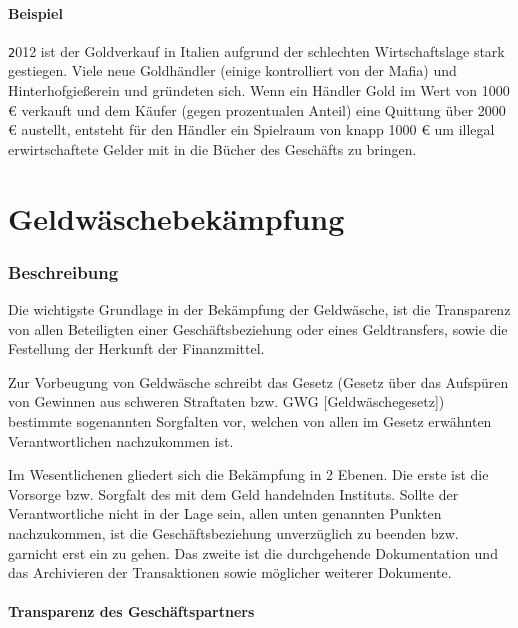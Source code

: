 \documentclass{article}
\begin{document}
        \subsection[Beispiel]{Beispiel}

            \texttt
            2012 ist der Goldverkauf in Italien aufgrund der schlechten Wirtschaftslage stark gestiegen.
            \cite{GoldItalien}
            Viele neue Goldhändler (einige kontrolliert von der Mafia) und Hinterhofgießerein und gründeten sich.
            Wenn ein Händler Gold im Wert von 1000 € verkauft und dem Käufer (gegen prozentualen Anteil) eine Quittung über 2000 € austellt, entsteht für den Händler ein Spielraum von knapp 1000 € um illegal erwirtschaftete Gelder mit in die Bücher des Geschäfts zu bringen.

\newpage

\part[Bekämpfung]{Geldwäschebekämpfung}

    \section[Beschreibung]{Beschreibung}

        Die wichtigste Grundlage in der Bekämpfung der Geldwäsche, ist die Transparenz von allen Beteiligten einer Geschäftsbeziehung oder eines Geldtransfers, sowie die Festellung der Herkunft der Finanzmittel.

        Zur Vorbeugung von Geldwäsche schreibt das Gesetz (Gesetz über das Aufspüren von Gewinnen aus schweren Straftaten bzw. GWG [Geldwäschegesetz]) bestimmte sogenannten Sorgfalten vor, welchen von allen im Gesetz erwähnten Verantwortlichen nachzukommen ist.

        Im Wesentlichenen gliedert sich die Bekämpfung in 2 Ebenen. Die erste ist die Vorsorge bzw. Sorgfalt des mit dem Geld handelnden Instituts. Sollte der Verantwortliche nicht in der Lage sein, allen unten genannten Punkten nachzukommen, ist die Geschäftsbeziehung unverzüglich zu beenden bzw. garnicht erst ein zu gehen. 
        Das zweite ist die durchgehende Dokumentation und das Archivieren der Transaktionen sowie möglicher weiterer Dokumente.

        \subsection[Transparenz des Geschäftspartners]{Transparenz des Geschäftspartners}
\end{document}

